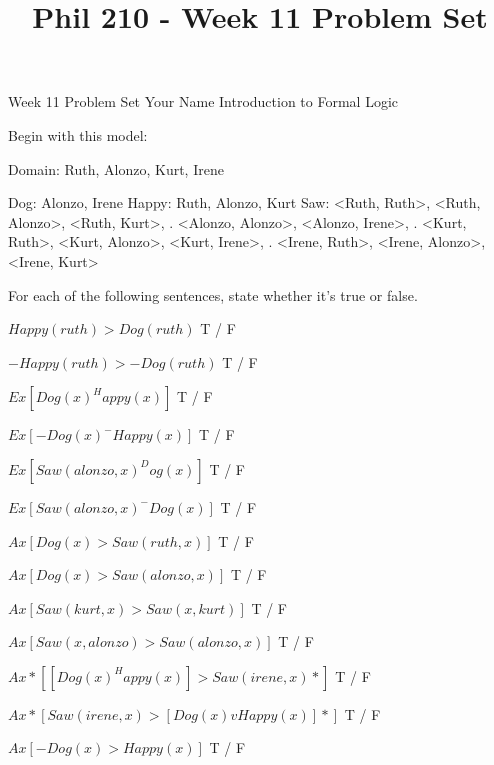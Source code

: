 
\title{Phil 210 - Week 11 Problem Set}

\heading
Week 11 Problem Set
Your Name
Introduction to Formal Logic
\endheading

Begin with this model:

\answer
        \firstordermodel 
        Domain: Ruth, Alonzo, Kurt, Irene

        Dog:    Alonzo, Irene
        Happy:  Ruth, Alonzo, Kurt
        Saw:    <Ruth, Ruth>, <Ruth, Alonzo>, <Ruth, Kurt>,
           .    <Alonzo, Alonzo>, <Alonzo, Irene>,
           .    <Kurt, Ruth>, <Kurt, Alonzo>, <Kurt, Irene>,
           .    <Irene, Ruth>, <Irene, Alonzo>, <Irene, Kurt>
        \endfirstordermodel
\endanswer\bigskip

For each of the following sentences, state whether it's true or false.

\quantifiers
\problems
{}
$ Happy(ruth) > Dog(ruth) $
        \answer
         T / F
        \endanswer

$ -Happy(ruth) > -Dog(ruth) $
        \answer
         T / F
        \endanswer

$ Ex[Dog(x) ^ Happy(x)] $
        \answer
         T / F
        \endanswer

$ Ex[-Dog(x) ^ -Happy(x)] $
        \answer
         T / F
        \endanswer

$ Ex[Saw(alonzo,x) ^ Dog(x)] $
        \answer
         T / F
        \endanswer

$ Ex[Saw(alonzo,x) ^ -Dog(x)] $
        \answer
         T / F
        \endanswer

$ Ax[Dog(x) > Saw(ruth,x)] $
        \answer
         T / F
        \endanswer

$ Ax[Dog(x) > Saw(alonzo,x)] $
        \answer
         T / F
        \endanswer

$ Ax[Saw(kurt,x) > Saw(x,kurt)] $
        \answer
         T / F
        \endanswer

$ Ax[Saw(x,alonzo) > Saw(alonzo,x)] $
        \answer
         T / F
        \endanswer

$ Ax*[[Dog(x) ^ Happy(x)] > Saw(irene,x)*] $
        \answer
         T / F
        \endanswer

$ Ax*[Saw(irene,x) > [Dog(x) v Happy(x)]*] $
        \answer
         T / F
        \endanswer

$ Ax[-Dog(x) > Happy(x)] $
        \answer
         T / F
        \endanswer

